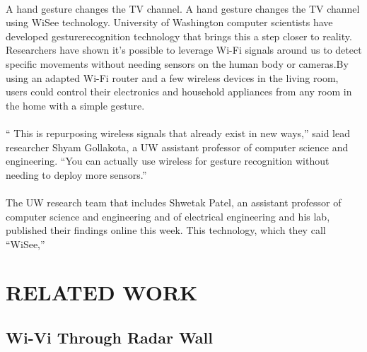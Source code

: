 \documentclass[a4paper,12pt,oneside]{article}
\begin{document}
\paragraph{}
A hand gesture changes the TV channel. A hand gesture changes the TV channel using
WiSee technology. University of Washington computer scientists have developed gesturerecognition
technology that brings this a step closer to reality. Researchers have shown it’s
possible to leverage Wi-Fi signals around us to detect specific movements without needing sensors on the human body or cameras.By using an adapted Wi-Fi router and a few wireless devices in the living room, users
could control their electronics and household appliances from any room in the home with a
simple gesture.
\paragraph{}
“ This is repurposing wireless signals that already exist in new ways,” said lead researcher
Shyam Gollakota, a UW assistant professor of computer science and engineering. “You can
actually use wireless for gesture recognition without needing to deploy more sensors.”
\paragraph{}
The UW research team that includes Shwetak Patel, an assistant professor of computer
science and engineering and of electrical engineering and his lab, published their findings online
this week. This technology, which they call “WiSee,”


\newpage
\section{RELATED WORK}
\subsection{Wi-Vi Through Radar Wall}
\end{document}
